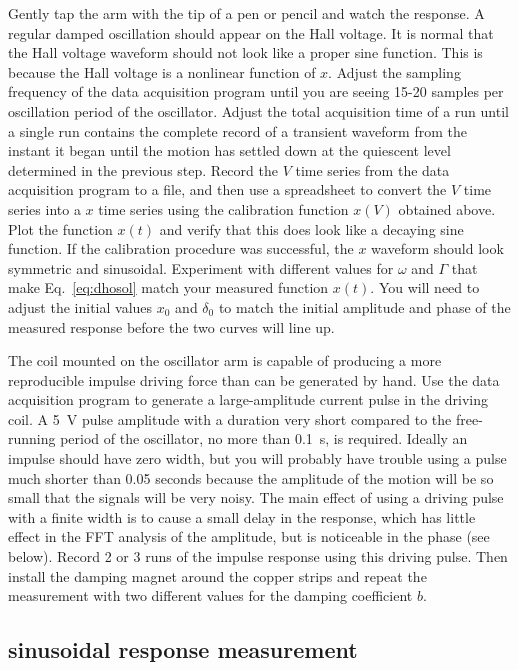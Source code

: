\documentclass{revtex4}
\begin{document}
Gently tap the arm with the tip of a pen or pencil and watch the response.
A regular damped oscillation should appear on the Hall voltage.  It is normal
that the Hall voltage waveform should not look like a proper sine function.
This is because the Hall voltage is a nonlinear function of $x$.  Adjust
the sampling frequency of the data acquisition program until you are seeing
15-20 samples per oscillation period of the oscillator.  Adjust the total
acquisition time of a run until a single run contains the complete record of
a transient waveform from the instant it began until the motion has settled
down at the quiescent level determined in the previous step.  Record the
$V$ time series from the data acquisition program to a file, and then use a
spreadsheet to convert the $V$ time series into a $x$ time series using the
calibration function $x(V)$ obtained above.  Plot the function $x(t)$ and
verify that this does look like a decaying sine function.  If the calibration
procedure was successful, the $x$ waveform should look symmetric and
sinusoidal.  Experiment with different values for $\omega$ and $\Gamma$
that make Eq.~\ref{eq:dhosol} match your measured function $x(t)$.  You 
will need to adjust the initial values $x_0$ and $\delta_0$ to match the
initial amplitude and phase of the measured response before the two curves
will line up.

The coil mounted on the oscillator arm is capable of producing a more
reproducible impulse driving force than can be generated by hand.  Use the
data acquisition program to generate a large-amplitude current pulse in the
driving coil.  A 5~V pulse amplitude with a duration very short compared to
the free-running period of the oscillator, no more than 0.1~s, is required.
Ideally an impulse should have zero width, but you will probably have trouble
using a pulse much shorter than 0.05 seconds because the amplitude of the
motion will be so small that the signals will be very noisy. The main effect
of using a driving pulse with a finite width is to cause a small delay in the
response, which has little effect in the FFT analysis of the amplitude, but
is noticeable in the phase (see below).  Record 2 or 3 runs of the impulse
response using this driving pulse.  Then install the damping magnet around
the copper strips and repeat the measurement with two different values for
the damping coefficient $b$.

\subsection{sinusoidal response measurement}
\end{document}
